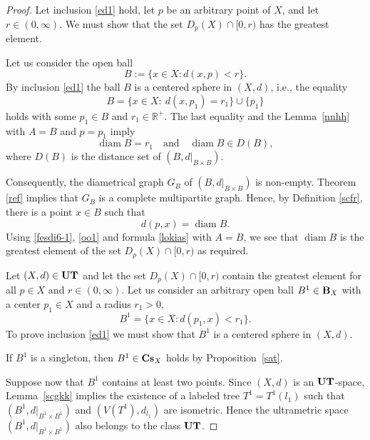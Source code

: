 \documentclass[10pt,a4paper]{amsart}
\begin{document}
\begin{proof}
Let inclusion \eqref{ed1} hold, let $p$ be an arbitrary point of $X$, and let
$r\in(0,\infty)$.
We must show that the set $D_p(X)\cap[0,r)$ has the greatest element. 

Let us consider the open ball
\begin{equation}\label{oo1}
    B:=\{x\in X \colon d(x,p)<r\}.
\end{equation}
 By inclusion \eqref{ed1} the ball $B$ is a centered sphere in $(X,d)$, i.e., the equality
\[
B=\{x\in X\colon \ d(x,p_1)=r_1\}\cup\{p_1\}
\]
holds with some $p_1\in B$ and $r_1\in \mathbb R^+$. The last equality and the Lemma~\ref{nnhh}  with $A=B$ and $p=p_1$ imply 
\[
\operatorname{diam} B=r_1 \quad \text{and} \quad
 \operatorname{diam} B\in D(B),
\]
where $D(B)$ is the distance set of $(B,d|_{B\times B})$.

Consequently, the diametrical graph \(G_B\) of \((B,d|_{B\times B})\) is non-empty.
Theorem \ref{ref} implies that \(G_B\) is a complete multipartite graph.
Hence, by Definition \ref{scfr}, there is a point \(x\in B\) such that
\begin{equation*}
d(p,x)=\operatorname{diam} B.
\end{equation*}
Using \eqref{fesdi6-1}, \eqref{oo1} and formula \eqref{lokias} with \(A=B\), we see that \(\operatorname{diam} B\) is the greatest element of the set \(D_p(X)\cap[0,r)\) as required.


Let $(X,d)\in {\bf UT}$ and let the set $D_p(X)\cap [0,r)$ contain the greatest element for all $p\in X$ and $r\in (0,\infty)$.
Let us consider an arbitrary open ball $B^1\in {\bf B}_X$ with  a center $p_1\in X$ and a radius $r_1>0$,
\begin{equation}
    \label{nn1}
    B^1=\{x\in X \colon d(p_1,x)<r_1\}.
\end{equation}
To prove inclusion \eqref{ed1} we must show that $B^1$ is a centered sphere in $(X,d)$.

If $B^1$ is a singleton, then $B^1\in {\bf Cs}_X$ holds by Proposition~\ref{sat}. 

Suppose now that $B^1$ contains at least two points.
Since $(X,d)$ is an ${\bf UT}$-space, Lemma~\ref{scgkk} implies the existence of a labeled tree
$T^{1}=T^{1}(l_{1})$ such that
$(B^1,d|_{B^{1}\times B^{1}})$ and $(V(T^{1}),d_{l_1})$
are isometric.
Hence the ultrametric space $(B^{1},d|_{B^{1}\times B^{1}})$ also belongs to the class
${\bf UT}$.


\end{proof}
\end{document}
